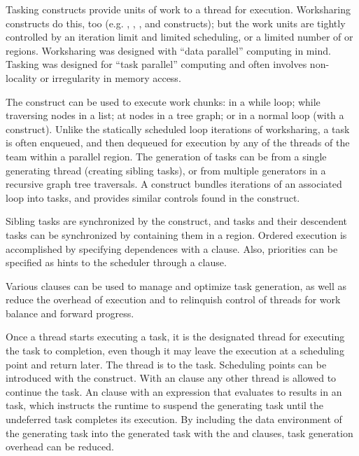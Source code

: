 \label{chap:tasking}

Tasking constructs provide units of work to a thread for execution.  
Worksharing constructs do this, too (e.g. , , 
, and  constructs); 
but the work units are tightly controlled by an iteration limit and limited 
scheduling, or a limited number of  or  regions. 
Worksharing was designed 
with ``data parallel'' computing in mind.  Tasking was designed for 
``task parallel'' computing and often involves non-locality or irregularity 
in memory access.

The  construct can be used to execute work chunks: in a while loop; 
while traversing nodes in a list; at nodes in a tree graph; 
or in a normal loop (with a  construct).  
Unlike the statically scheduled loop iterations of worksharing, a task is 
often enqueued, and then dequeued for execution by any of the threads of the
team within a parallel region. The generation of tasks can be from a single 
generating thread (creating sibling tasks), or from multiple generators
in a recursive graph tree traversals. 
A  construct
bundles iterations of an associated loop into tasks, and provides 
similar controls found in the  construct.

Sibling tasks are synchronized by the  construct, and tasks
and their descendent tasks can be synchronized by containing them in
a  region.  Ordered execution is accomplished by specifying
dependences with a  clause. Also, priorities can be
specified as hints to the scheduler through a  clause.

Various clauses can be used to manage and optimize task generation,
as well as reduce the overhead of execution and to relinquish 
control of threads for work balance and forward progress. 

Once a thread starts executing a task, it is the designated thread 
for executing the task to completion, even though it may leave the
execution at a scheduling point and return later.  The thread is 
to the task.  Scheduling points can be introduced with the 
construct.  With an  clause any other thread is allowed to continue
the task.  An  clause with an expression that evaluates to  
results in an  task, which instructs the runtime to suspend
the generating task until the undeferred task completes its execution.
By including the data environment of the generating task into the generated task with the 
 and  clauses, task generation overhead can be reduced.

